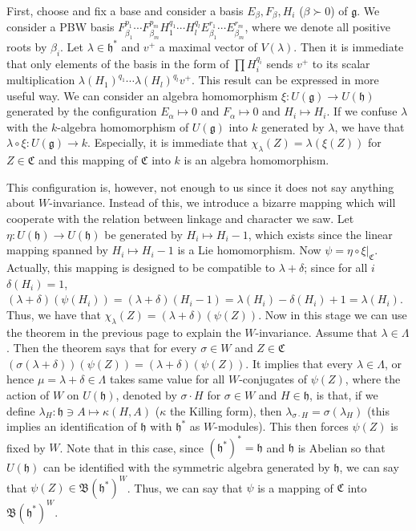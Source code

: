 \documentclass{article}
\newcommand{\lie}[1]{\mathfrak{#1}}
\begin{document}
First, choose and fix a base and consider a basis $E_\beta, F_\beta, H_i$ ($\beta \succ 0$) of $\lie{g}$.
We consider a PBW basis $F_{\beta_1}^{p_1} \cdots F_{\beta_m}^{p_m} H_1^{q_1} \cdots H_l^{q_l} E_{\beta_1}^{r_1} \cdots E_{\beta_m}^{r_m}$, where we denote all positive roots by $\beta_i$.
Let $\lambda \in \lie{h}^*$ and $v^+$ a maximal vector of $V(\lambda)$.
Then it is immediate that only elements of the basis in the form of $\prod H_i^{q_i}$ sends $v^+$ to its scalar multiplication $\lambda(H_1)^{q_1} \cdots \lambda(H_l)^{q_l} v^+$.
This result can be expressed in more useful way.
We can consider an algebra homomorphism $\xi : U(\lie{g}) \to U(\lie{h})$ generated by the configuration $E_\alpha \mapsto 0$ and $F_\alpha \mapsto 0$ and $H_i \mapsto H_i$.
If we confuse $\lambda$ with the $k$-algebra homomorphism of $U(\lie{g})$ into $k$ generated by $\lambda$, we have that $\lambda \circ \xi : U(\lie{g}) \to k$.
Especially, it is immediate that $\chi_\lambda(Z) = \lambda(\xi(Z))$ for $Z \in \mathfrak{C}$ and this mapping of $\mathfrak{C}$ into $k$ is an algebra homomorphism.

This configuration is, however, not enough to us since it does not say anything about $W$-invariance.
Instead of this, we introduce a bizarre mapping which will cooperate with the relation between linkage and character we saw.
Let $\eta : U(\lie{h}) \to U(\lie{h})$ be generated by $H_i \mapsto H_i - 1$, which exists since the linear mapping spanned by $H_i \mapsto H_i - 1$ is a Lie homomorphism.
Now $\psi = \eta \circ \xi|_\mathfrak{C}$.
Actually, this mapping is designed to be compatible to $\lambda + \delta$; since for all $i$ $\delta(H_i) = 1$, $(\lambda + \delta)(\psi(H_i)) = (\lambda + \delta)(H_i - 1) = \lambda(H_i) - \delta(H_i) + 1 = \lambda(H_i)$.
Thus, we have that $\chi_\lambda(Z) = (\lambda + \delta)(\psi(Z))$.
Now in this stage we can use the theorem in the previous page to explain the $W$-invariance.
Assume that $\lambda \in \Lambda$.
Then the theorem says that for every $\sigma \in W$ and $Z \in \mathfrak{C}$ $(\sigma(\lambda + \delta))(\psi(Z)) = (\lambda + \delta)(\psi(Z))$.
It implies that every $\lambda \in \Lambda$, or hence $\mu = \lambda + \delta \in \Lambda$ takes same value for all $W$-conjugates of $\psi(Z)$, where the action of $W$ on $U(\lie{h})$, denoted by $\sigma \cdot H$ for $\sigma \in W$ and $H \in \lie{h}$, is that, if we define $\lambda_H : \lie{h} \ni A \mapsto \kappa(H, A)$ ($\kappa$ the Killing form), then $\lambda_{\sigma \cdot H} = \sigma(\lambda_H)$ (this implies an identification of $\lie{h}$ with $\lie{h}^*$ as $W$-modules).
This then forces $\psi(Z)$ is fixed by $W$.
Note that in this case, since $(\lie{h}^*)^* = \lie{h}$ and $\lie{h}$ is Abelian so that $U(\lie{h})$ can be identified with the symmetric algebra generated by $\lie{h}$, we can say that $\psi(Z) \in \mathfrak{B}(\lie{h}^*)^W$.
Thus, we can say that $\psi$ is a mapping of $\mathfrak{C}$ into $\mathfrak{B}(\lie{h}^*)^W$.
\end{document}
